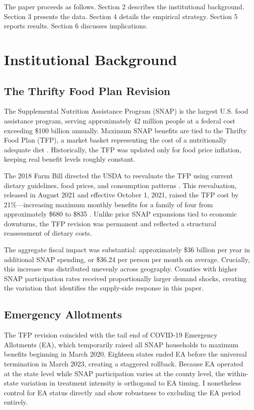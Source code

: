 \documentclass[12pt]{article}
\begin{document}
The paper proceeds as follows. Section 2 describes the institutional background. Section 3 presents the data. Section 4 details the empirical strategy. Section 5 reports results. Section 6 discusses implications.

\section{Institutional Background}

\subsection{The Thrifty Food Plan Revision}

The Supplemental Nutrition Assistance Program (SNAP) is the largest U.S. food assistance program, serving approximately 42 million people at a federal cost exceeding \$100 billion annually. Maximum SNAP benefits are tied to the Thrifty Food Plan (TFP), a market basket representing the cost of a nutritionally adequate diet \citep{hoynes2016}. Historically, the TFP was updated only for food price inflation, keeping real benefit levels roughly constant.

The 2018 Farm Bill directed the USDA to reevaluate the TFP using current dietary guidelines, food prices, and consumption patterns \citep{cunnyngham2023}. This reevaluation, released in August 2021 and effective October 1, 2021, raised the TFP cost by 21\%---increasing maximum monthly benefits for a family of four from approximately \$680 to \$835 \citep{usda2021tfp}. Unlike prior SNAP expansions tied to economic downturns, the TFP revision was permanent and reflected a structural reassessment of dietary costs.

The aggregate fiscal impact was substantial: approximately \$36 billion per year in additional SNAP spending, or \$36.24 per person per month on average. Crucially, this increase was distributed unevenly across geography. Counties with higher SNAP participation rates received proportionally larger demand shocks, creating the variation that identifies the supply-side response in this paper.

\subsection{Emergency Allotments}

The TFP revision coincided with the tail end of COVID-19 Emergency Allotments (EA), which temporarily raised all SNAP households to maximum benefits beginning in March 2020. Eighteen states ended EA before the universal termination in March 2023, creating a staggered rollback. Because EA operated at the state level while SNAP participation varies at the county level, the within-state variation in treatment intensity is orthogonal to EA timing. I nonetheless control for EA status directly and show robustness to excluding the EA period entirely.
\end{document}
